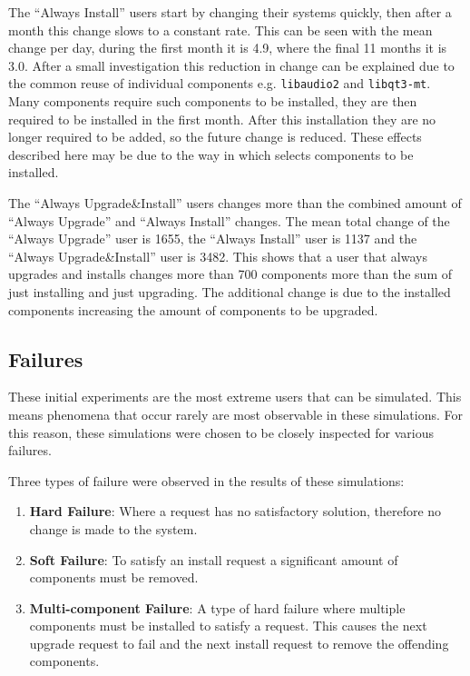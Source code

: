 The ``Always Install'' users start by changing their systems quickly, then after a month this change slows to a constant rate.
This can be seen with the mean change per day, during the first month it is 4.9, where the final 11 months it is 3.0.
After a small investigation this reduction in change can be explained due to the common reuse of individual components e.g. \texttt{libaudio2} and \texttt{libqt3-mt}.
Many components require such components to be installed, they are then required to be installed in the first month.
After this installation they are no longer required to be added, so the future change is reduced. 
These effects described here may be due to the way in which \usermodel selects components to be installed.

The ``Always Upgrade\&Install'' users changes more than the combined amount of ``Always Upgrade'' and ``Always Install'' changes.
The mean total change of the ``Always Upgrade'' user is 1655, the ``Always Install'' user is 1137 and the ``Always Upgrade\&Install'' user is 3482.
This shows that a user that always upgrades and installs changes more than 700 components more than the sum of just installing and just upgrading.
The additional change is due to the installed components increasing the amount of components to be upgraded.

\subsection{Failures}
These initial experiments are the most extreme users that can be simulated.
This means phenomena that occur rarely are most observable in these simulations.
For this reason, these simulations were chosen to be closely inspected for various failures.

Three types of failure were observed in the results of these simulations:
\begin{enumerate}
  \item \textbf{Hard Failure}: Where a request has no satisfactory solution, therefore no change is made to the system.
  \item \textbf{Soft Failure}: To satisfy an install request a significant amount of components must be removed.
  \item \textbf{Multi-component Failure}: A type of hard failure where multiple components must be installed to satisfy a request. 
  This causes the next upgrade request to fail and the next install request to remove the offending components.
\end{enumerate}

